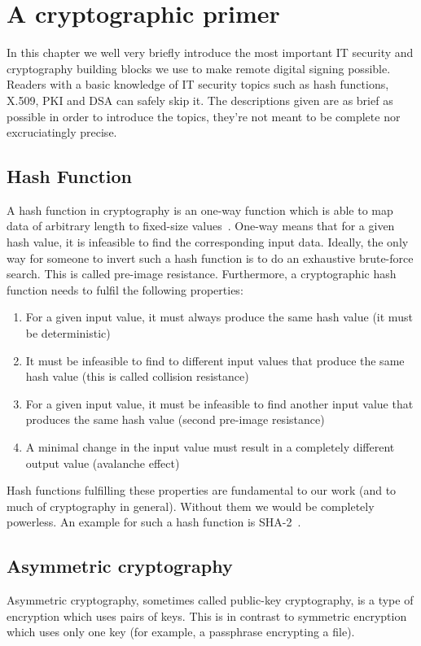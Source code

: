 \chapter{A cryptographic primer}\label{ch:a-cryptographic-primer}
In this chapter we well very briefly introduce the most important IT security and cryptography building blocks we use to make remote digital signing possible.
Readers with a basic knowledge of IT security topics such as hash functions, X.509, \gls{PKI} and \gls{DSA} can safely skip it.
The descriptions given are as brief as possible in order to introduce the topics, they're not meant to be complete nor excruciatingly precise.

\section{Hash Function}\label{sec:hash-function}
A hash function in cryptography is an one-way function which is able to map data of arbitrary length to fixed-size values~\cite{hashing}.
One-way means that for a given hash value, it is infeasible to find the corresponding input data.
Ideally, the only way for someone to invert such a hash function is to do an exhaustive brute-force search.
This is called pre-image resistance.
Furthermore, a cryptographic hash function needs to fulfil the following properties:
\begin{enumerate}
    \item For a given input value, it must always produce the same hash value (it must be deterministic)
    \item It must be infeasible to find to different input values that produce the same hash value (this is called collision resistance)
    \item For a given input value, it must be infeasible to find another input value that produces the same hash value (second pre-image resistance)
    \item A minimal change in the input value must result in a completely different output value (avalanche effect)
\end{enumerate}

Hash functions fulfilling these properties are fundamental to our work (and to much of cryptography in general).
Without them we would be completely powerless.
An example for such a hash function is \gls{SHA-2}~\cite{sha2patent}.

\section{Asymmetric cryptography}\label{sec:asymmetric-cryptography}
Asymmetric cryptography, sometimes called public-key cryptography, is a type of encryption which uses pairs of keys.
This is in contrast to symmetric encryption which uses only one key (for example, a passphrase encrypting a file).

